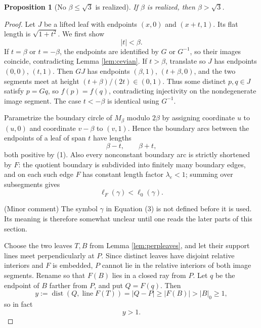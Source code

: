 \documentclass[12pt]{article}
\theoremstyle{plain}
\newtheorem{proposition}[theorem]{Proposition}
\newcommand{\review}[1]{\begin{reviewbox}#1\end{reviewbox}}
\begin{document}
\begin{proposition}[No \(\beta\le\sqrt3\) is realized]\label{prop:lower}
If \(\beta\) is realized, then \(\beta>\sqrt3\).
\end{proposition}

\begin{proof}
Let \(J\) be a lifted leaf with endpoints \((x,0)\) and \((x+t,1)\).  Its flat
length is \(\sqrt{1+t^2}\).  We first show
\[
|t|<\beta. \tag{1}
\]
If \(t=\beta\) or \(t=-\beta\), the endpoints are identified by \(G\) or
\(G^{-1}\), so their images coincide, contradicting Lemma \ref{lem:cevian}.  If
\(t>\beta\), translate so \(J\) has endpoints \((0,0)\), \((t,1)\).  Then
\(GJ\) has endpoints \((\beta,1)\), \((t+\beta,0)\), and the two segments meet
at height \((t+\beta)/(2t)\in(0,1)\).  Thus some distinct \(p,q\in J\) satisfy
\(p=Gq\), so \(f(p)=f(q)\), contradicting injectivity on the nondegenerate
image segment.  The case \(t<-\beta\) is identical using \(G^{-1}\).

Parametrize the boundary circle of \(M_\beta\) modulo \(2\beta\) by assigning
coordinate \(u\) to \((u,0)\) and coordinate \(v-\beta\) to \((v,1)\).  Hence
the boundary arcs between the endpoints of a leaf of span \(t\) have lengths
\[
\beta-t,\qquad \beta+t, \tag{2}
\]
both positive by (1).  Also every nonconstant boundary arc is strictly
shortened by \(F\): the quotient boundary is subdivided into finitely many
boundary edges, and on each such edge \(F\) has constant length factor 
\(\lambda_e<1\); summing over subsegments gives
\[
\ell_F(\gamma)<\ell_0(\gamma). \tag{3}
\]
\review{(Minor comment) The symbol $\gamma$ in Equation (3) is not defined before it is used. Its meaning is therefore somewhat unclear until one reads the later parts of this section.}

Choose the two leaves \(T,B\) from Lemma \ref{lem:perpleaves}, and let their
support lines meet perpendicularly at \(P\).  Since distinct leaves have
disjoint relative interiors and \(F\) is embedded, \(P\) cannot lie in the
relative interiors of both image segments.  Rename so that \(F(B)\) lies in a
closed ray from \(P\).  Let \(q\) be the endpoint of \(B\) farther from \(P\),
and put \(Q=F(q)\).  Then
\[
y:=\operatorname{dist}(Q,\operatorname{line}F(T))=|Q-P|\ge |F(B)|>|B|_0\ge1,
\]
so in fact
\[
y>1. \tag{4}
\]


\end{proof}
\end{document}

